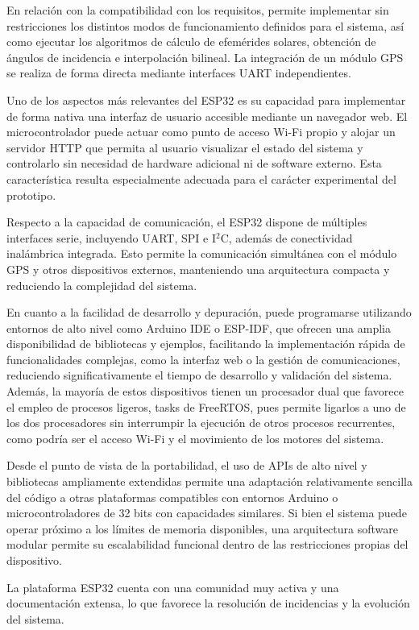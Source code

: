 En relación con la compatibilidad con los requisitos, permite implementar sin restricciones los distintos modos de funcionamiento definidos para el sistema, así como ejecutar los algoritmos de cálculo de efemérides solares, obtención de ángulos de incidencia e interpolación bilineal. La integración de un módulo GPS se realiza de forma directa mediante interfaces UART independientes.

Uno de los aspectos más relevantes del ESP32 es su capacidad para implementar de forma nativa una interfaz de usuario accesible mediante un navegador web. El microcontrolador puede actuar como punto de acceso Wi-Fi propio y alojar un servidor HTTP que permita al usuario visualizar el estado del sistema y controlarlo sin necesidad de hardware adicional ni de software externo. Esta característica resulta especialmente adecuada para el carácter experimental del prototipo.

Respecto a la capacidad de comunicación, el ESP32 dispone de múltiples interfaces serie, incluyendo UART, SPI e I$^2$C, además de conectividad inalámbrica integrada. Esto permite la comunicación simultánea con el módulo GPS y otros dispositivos externos, manteniendo una arquitectura compacta y reduciendo la complejidad del sistema.

En cuanto a la facilidad de desarrollo y depuración, puede programarse utilizando entornos de alto nivel como Arduino IDE o ESP-IDF, que ofrecen una amplia disponibilidad de bibliotecas y ejemplos, facilitando la implementación rápida de funcionalidades complejas, como la interfaz web o la gestión de comunicaciones, reduciendo significativamente el tiempo de desarrollo y validación del sistema. Además, la mayoría de estos dispositivos tienen un procesador dual que favorece el empleo de procesos ligeros, tasks de FreeRTOS, pues permite ligarlos a uno de los dos procesadores sin interrumpir la ejecución de otros procesos recurrentes, como podría ser el acceso Wi-Fi y el movimiento de los motores del sistema.

Desde el punto de vista de la portabilidad, el uso de APIs de alto nivel y bibliotecas ampliamente extendidas permite una adaptación relativamente sencilla del código a otras plataformas compatibles con entornos Arduino o microcontroladores de 32 bits con capacidades similares. Si bien el sistema puede operar próximo a los límites de memoria disponibles, una arquitectura software modular permite su escalabilidad funcional dentro de las restricciones propias del dispositivo.

La plataforma ESP32 cuenta con una comunidad muy activa y una documentación extensa, lo que favorece la resolución de incidencias y la evolución del sistema.

